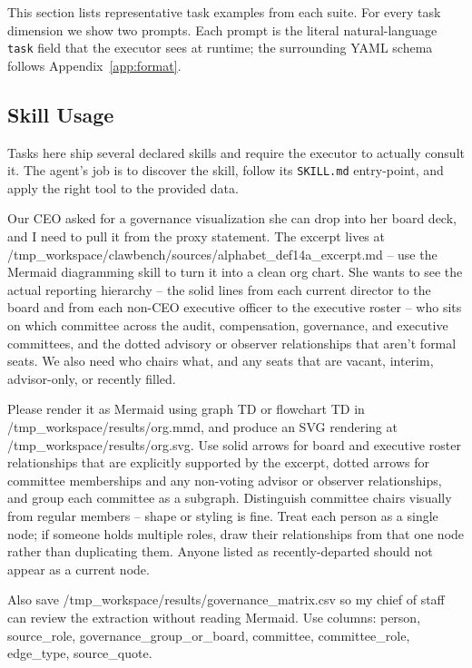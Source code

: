 
This section lists representative task examples from each suite. For
every task dimension we show two prompts. Each prompt is the literal
natural-language \texttt{task} field that the executor sees at
runtime; the surrounding YAML schema follows
Appendix~\ref{app:format}.

\subsection{Skill Usage}\label{app:examples:skill}

Tasks here ship several declared skills and require the executor to actually
consult it. The agent's job is to discover the skill, follow its
\texttt{SKILL.md} entry-point, and apply the right tool to the
provided data.

\begin{clawcode}[title={\texttt{task\_05\_org\_chart\_mermaid}}]
Our CEO asked for a governance visualization she can drop into her
board deck, and I need to pull it from the proxy statement. The
excerpt lives at
/tmp_workspace/clawbench/sources/alphabet_def14a_excerpt.md -- use the
Mermaid diagramming skill to turn it into a clean org chart. She wants
to see the actual reporting hierarchy -- the solid lines from each
current director to the board and from each non-CEO executive officer
to the executive roster -- who sits on which committee across the
audit, compensation, governance, and executive committees, and the
dotted advisory or observer relationships that aren't formal seats.
We also need who chairs what, and any seats that are vacant, interim,
advisor-only, or recently filled.

Please render it as Mermaid using graph TD or flowchart TD in
/tmp_workspace/results/org.mmd, and produce an SVG rendering at
/tmp_workspace/results/org.svg. Use solid arrows for board and
executive roster relationships that are explicitly supported by the
excerpt, dotted arrows for committee memberships and any non-voting
advisor or observer relationships, and group each committee as a
subgraph. Distinguish committee chairs visually from regular members
-- shape or styling is fine. Treat each person as a single node; if
someone holds multiple roles, draw their relationships from that one
node rather than duplicating them. Anyone listed as recently-departed
should not appear as a current node.

Also save /tmp_workspace/results/governance_matrix.csv so my chief of
staff can review the extraction without reading Mermaid. Use columns:
person, source_role, governance_group_or_board, committee,
committee_role, edge_type, source_quote.
\end{clawcode}

